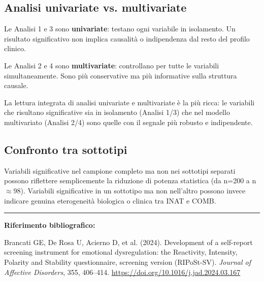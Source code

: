 \documentclass[12pt, a4paper]{article}
\begin{document}
\subsection{Analisi univariate vs. multivariate}

Le Analisi 1 e 3 sono \textbf{univariate}: testano ogni variabile in isolamento. Un risultato
significativo non implica causalità o indipendenza dal resto del profilo clinico.

Le Analisi 2 e 4 sono \textbf{multivariate}: controllano per tutte le variabili simultaneamente.
Sono più conservative ma più informative sulla struttura causale.

La lettura integrata di analisi univariate e multivariate è la più ricca: le variabili che
risultano significative sia in isolamento (Analisi 1/3) che nel modello multivariato
(Analisi 2/4) sono quelle con il segnale più robusto e indipendente.

\subsection{Confronto tra sottotipi}

Variabili significative nel campione completo ma non nei sottotipi separati possono riflettere
semplicemente la riduzione di potenza statistica (da n=200 a n$\approx$98). Variabili
significative in un sottotipo ma non nell'altro possono invece indicare genuina eterogeneità
biologica o clinica tra INAT e COMB.

\bigskip

\hrule
\bigskip

\noindent\small\textbf{Riferimento bibliografico:}

Brancati GE, De Rosa U, Acierno D, et al. (2024). Development of a self-report screening
instrument for emotional dysregulation: the Reactivity, Intensity, Polarity and Stability
questionnaire, screening version (RIPoSt-SV). \textit{Journal of Affective Disorders},
355, 406--414. \url{https://doi.org/10.1016/j.jad.2024.03.167}
\end{document}
